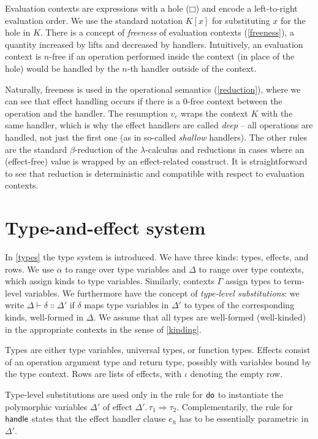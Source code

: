 \documentclass[a4paper, 11pt,titlepage, openright, twoside]{report}
\newcommand{\keyword}[1]{\textsf{\textup{#1}}}
\newcommand{\KwDo}{\keyword{do}}
\newcommand{\KwHandle}{\keyword{handle}}
\newcommand{\Free}{\textrm{-}\mathrm{free}}
\newcommand{\+}{\enspace}
\begin{document}
Evaluation contexts are expressions with a hole ($□$) and
encode a left-to-right evaluation order.
We use the standard notation $K[x]$ for substituting $x$ for the hole in $K$.
There is a concept of {\em freeness} of evaluation contexts (\cref{freeness}),
a quantity increased by lifts and decreased by handlers.
Intuitively, an evaluation context is $n\Free$
if an operation performed inside the context (in place of the hole) %
would be handled by the $n$-th handler outside of the context.

Naturally, freeness is used in the operational semantics (\cref{reduction}),
where we can see that effect handling occurs if there
is a $0\Free$ context between the operation and the handler.
The resumption $v_c$ wraps the context $K$
with the same handler, which is why the effect handlers are called {\em deep}
– all operations are handled, not just the first one (as in so-called {\em shallow} handlers).
The other rules are the standard $β$-reduction of the $λ$-calculus
and reductions in cases where an (effect-free) value is wrapped by an effect-related construct.
It is straightforward to see that reduction is deterministic
and compatible with respect to evaluation contexts.

\section{Type-and-effect system}

In \cref{types} the type system is introduced.
We have three kinds: types, effects, and rows.
We use $α$ to range over type variables and
$Δ$ to range over type contexts, which assign kinds to type variables.
Similarly, contexts $Γ$ assign types to term-level variables.
We furthermore have the concept of {\em type-level substitutions}:
we write $Δ ⊢ δ ∷ Δ'$ if $δ$ maps type variables in $Δ'$ to types of the corresponding kinds,
well-formed in $Δ$.
We assume that all types are well-formed (well-kinded) in the appropriate contexts in the sense of \cref{kinding}.

Types are either type variables, universal types, or function types.
Effects consist of an operation argument type and return type,
possibly with variables bound by the type context.
Rows are lists of effects,
with $ι$ denoting the empty row.

Type-level substitutions are used only in the rule for $\KwDo$
to instantiate the polymorphic variables $Δ'$ of effect $Δ'.\,τ_1 \Rightarrow τ_2$.
Complementarily, the rule for $\KwHandle$ states that the effect handler clause $e_h$
has to be essentially parametric in $Δ'$.
\end{document}
